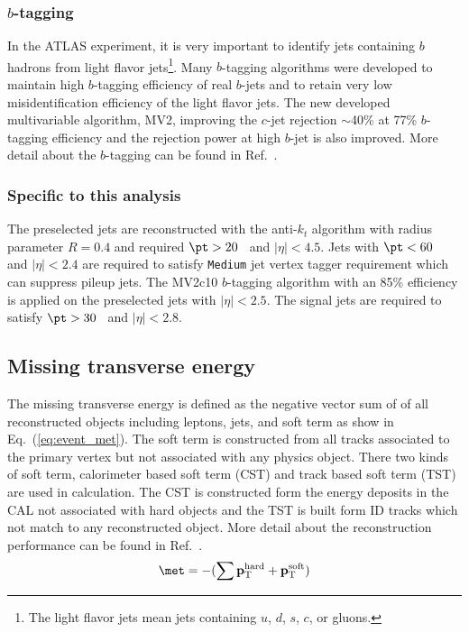 
\subsubsection{$b$-tagging}
\label{subsubsec:event_bjets}
In the ATLAS experiment, it is very important to identify jets containing $b$ hadrons from light flavor jets\footnote{The light flavor jets mean jets containing $u$, $d$, $s$, $c$, or gluons.}.
Many $b$-tagging algorithms were developed to maintain high $b$-tagging efficiency of real $b$-jets and to retain very low misidentification efficiency of the light flavor jets.
The new developed multivariable algorithm, MV2, improving the $c$-jet rejection $\sim$40\% at 77\% $b$-tagging efficiency and the rejection power at high $b$-jet \pt is also improved.
More detail about the $b$-tagging can be found in Ref.~\cite{ATL-PHYS-PUB-2015-022, ATL-PHYS-PUB-2016-012}.


\subsubsection{Specific to this analysis}
\label{subsubsec:event_jets_specific}
The preselected jets are reconstructed with the anti-$k_{t}$ algorithm with radius parameter $R = 0.4$ and required $\pt > 20$~{\GeV} and $|\eta| < 4.5$.
Jets with $\pt < 60$~{\GeV} and $|\eta| < 2.4$ are required to satisfy \texttt{Medium} jet vertex tagger requirement which can suppress pileup jets.
The MV2c10 $b$-tagging algorithm with an 85\% efficiency is applied on the preselected jets with $|\eta| < 2.5$.
The signal jets are required to satisfy $\pt > 30$~{\GeV} and $|\eta| < 2.8$.


\subsection{Missing transverse energy}
\label{subsec:event_met}
The missing transverse energy \met is defined as the negative vector sum of \pt of all reconstructed objects including leptons, jets, and soft term as show in Eq.~(\ref{eq:event_met}).
The soft term is constructed from all tracks associated to the primary vertex but not associated with any physics object.
There two kinds of soft term, calorimeter based soft term (CST) and track based soft term (TST) are used in \met calculation.
The CST \met is constructed form the energy deposits in the CAL not associated with hard objects and the TST \met is built form ID tracks which not match to any reconstructed object.
More detail about the \met reconstruction performance can be found in Ref.~\cite{ATL-PHYS-PUB-2015-023}.
%
\begin{equation}
    \met = - (\sum \mathbf{p}_{\mathrm{T}}^{\mathrm{hard}} + \mathbf{p}_{\mathrm{T}}^{\mathrm{soft}})
    \label{eq:event_met}
\end{equation}
%

